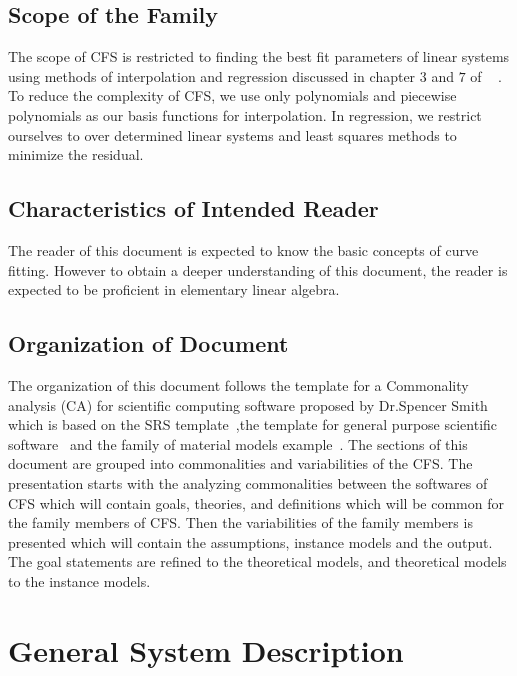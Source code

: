\documentclass[12pt]{article}
\newcommand{\famname}{CFS} %
\begin{document}
\subsection{Scope of the Family}\label{Scope}
The scope of \famname{} is restricted to finding the best fit parameters of linear systems using methods of interpolation and regression discussed in chapter $3$ and $7$ of ~\cite{Health1997} . To reduce the complexity of \famname{}, we use only polynomials and piecewise polynomials as our basis functions for interpolation. In regression, we restrict ourselves to over determined linear systems and least squares methods to minimize the residual.\\


 

\subsection{Characteristics of Intended Reader} 
The reader of this document is expected to know the basic concepts of curve fitting. However to obtain a deeper understanding of this document, the reader is expected to be proficient in elementary linear algebra.

\subsection{Organization of Document}
The organization of this document follows the template for a Commonality analysis (CA) for scientific computing software proposed by Dr.Spencer Smith which is based on the SRS template~\cite{SmithEtAl2007},the template for general purpose scientific software~\cite{Smith2006} and the family of material models example~\cite{SmithMcCutchanAndCarette2017}. The sections of this document are grouped into commonalities and variabilities of the \famname{}. The presentation starts with the analyzing commonalities between the softwares of \famname{} which will contain goals, theories,  and definitions which will be common for the family members of \famname{}. Then the variabilities of the family members is presented which will contain the assumptions, instance models and the output. The goal statements are refined to the theoretical models, and theoretical models to the instance models.

\section{General System Description}
\end{document}
